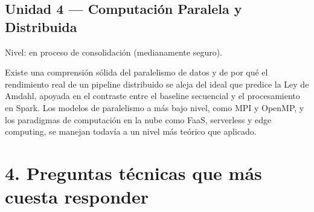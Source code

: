 \documentclass[12pt]{article}
\begin{document}
\subsection*{Unidad 4 --- Computación Paralela y Distribuida}
Nivel: en proceso de consolidación (medianamente seguro).

Existe una comprensión sólida del paralelismo de datos y de por qué el rendimiento real de un pipeline distribuido se aleja del ideal que predice la Ley de Amdahl, apoyada en el contraste entre el baseline secuencial y el procesamiento en Spark. Los modelos de paralelismo a más bajo nivel, como MPI y OpenMP, y los paradigmas de computación en la nube como FaaS, serverless y edge computing, se manejan todavía a un nivel más teórico que aplicado.

\section*{4. Preguntas técnicas que más cuesta responder}
\end{document}
